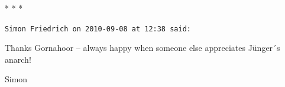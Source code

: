 
\begin{center}* * *\end{center}

\begin{footnotesize}
\begin{sffamily}
\texttt{Simon Friedrich on 2010-09-08 at 12:38 said:}

Thanks Gornahoor -- always happy when someone else appreciates Jünger´s anarch!

Simon


\hfill

\end{sffamily}
\end{footnotesize}

